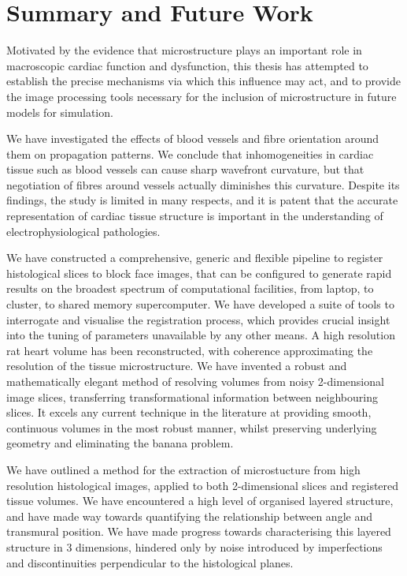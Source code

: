 \chapter{Summary and Future Work}
\dblspace
  Motivated by the evidence that microstructure plays an important role in macroscopic cardiac function and dysfunction, this thesis has attempted to establish the precise mechanisms via which this influence may act, and to provide the image processing tools necessary for the inclusion of microstructure in future models for simulation.
  
  We have investigated the effects of blood vessels and fibre orientation around them on propagation patterns. We conclude that inhomogeneities in cardiac tissue such as blood vessels can cause sharp wavefront curvature, but that negotiation of fibres around vessels actually diminishes this curvature. Despite its findings, the study is limited in many respects, and it is patent that the accurate representation of cardiac tissue structure is important in the understanding of electrophysiological pathologies.
  
  We have constructed a comprehensive, generic and flexible pipeline to register histological slices to block face images, that can be configured to generate rapid results on the broadest spectrum of computational facilities, from laptop, to cluster, to shared memory supercomputer. We have developed a suite of tools to interrogate and visualise the registration process, which provides crucial insight into the tuning of parameters unavailable by any other means. A high resolution rat heart volume has been reconstructed, with coherence approximating the resolution of the tissue microstructure. We have invented a robust and mathematically elegant method of resolving volumes from noisy 2-dimensional image slices, transferring transformational information between neighbouring slices. It excels any current technique in the literature at providing smooth, continuous volumes in the most robust manner, whilst preserving underlying geometry and eliminating the banana problem.
  
  We have outlined a method for the extraction of microstucture from high resolution histological images, applied to both 2-dimensional slices and registered tissue volumes. We have encountered a high level of organised layered structure, and have made way towards quantifying the relationship between angle and transmural position. We have made progress towards characterising this layered structure in 3 dimensions, hindered only by noise introduced by imperfections and discontinuities perpendicular to the histological planes.
  
